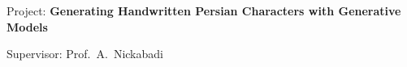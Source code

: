 \begin{cventries}
{\begin{cvitems}
{\begin{adjustwidth}{4mm}{}
\begin{tabular}{l@{\hskip 5mm}l@{\hskip 5mm}l}
            \end{tabular}
          	\medskip
          \end{adjustwidth}
        }
        \item{
          Project: \textbf{Generating Handwritten Persian Characters with Generative Models}
        }
        \item{
          Supervisor: Prof.~A.~Nickabadi
        }
      \end{cvitems}
    }


\vspace*{-1mm}

\end{cventries}
